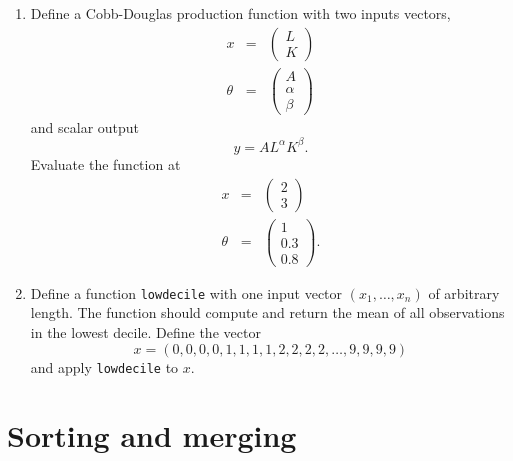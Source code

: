 \documentclass{article}
\begin{document}
\begin{enumerate}
\item Define a Cobb-Douglas production function with two inputs vectors,%
\begin{eqnarray*}
x &=&\left( 
\begin{array}{c}
L \\ 
K%
\end{array}%
\right) \\
\theta &=&\left( 
\begin{array}{c}
A \\ 
\alpha \\ 
\beta%
\end{array}%
\right)
\end{eqnarray*}%
and scalar output%
\begin{equation*}
y=AL^{\alpha }K^{\beta }.
\end{equation*}%
Evaluate the function at%
\begin{eqnarray*}
x &=&\left( 
\begin{array}{c}
2 \\ 
3%
\end{array}%
\right) \\
\theta &=&\left( 
\begin{array}{c}
1 \\ 
0.3 \\ 
0.8%
\end{array}%
\right) .
\end{eqnarray*}

\item Define a function \texttt{lowdecile} with one input vector $\left(
x_{1},\ldots ,x_{n}\right) $ of arbitrary length. The function should
compute and return the mean of all observations in the lowest decile. Define
the vector%
\begin{equation*}
x=\left( 0,0,0,0,1,1,1,1,2,2,2,2,\ldots ,9,9,9,9\right)
\end{equation*}%
and apply \texttt{lowdecile} to $x$.
\end{enumerate}


\newpage



\section{Sorting and merging}
\end{document}
